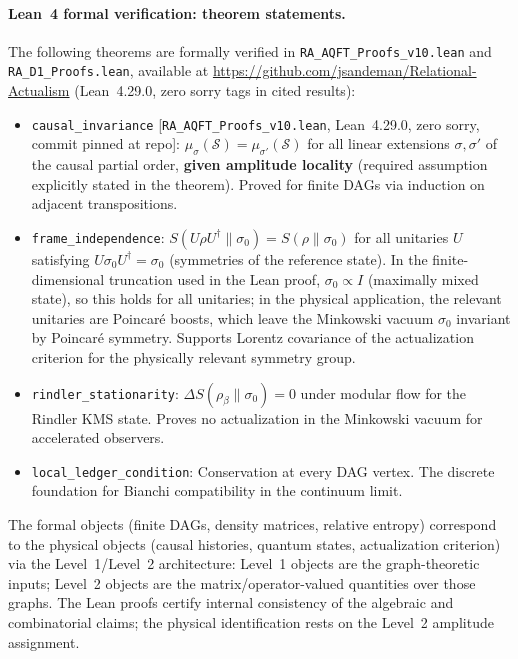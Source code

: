 \documentclass[11pt,a4paper]{article}
\theoremstyle{plain}
\theoremstyle{definition}
\theoremstyle{remark}
\begin{document}

\paragraph{Lean~4 formal verification: theorem statements.}
The following theorems are formally verified in
\texttt{RA\_AQFT\_Proofs\_v10.lean} and \texttt{RA\_D1\_Proofs.lean},
available at \url{https://github.com/jsandeman/Relational-Actualism}
(Lean~4.29.0, zero sorry tags in cited results):

\begin{itemize}[noitemsep]
  \item \texttt{causal\_invariance} [\texttt{RA\_AQFT\_Proofs\_v10.lean},
    Lean~4.29.0, zero sorry, commit pinned at repo]:
    $\mu_\sigma(\mathcal{S}) = \mu_{\sigma'}(\mathcal{S})$
    for all linear extensions $\sigma, \sigma'$ of the causal partial order,
    \textbf{given amplitude locality} (required assumption explicitly stated
    in the theorem). Proved for finite DAGs via induction on adjacent transpositions.
  \item \texttt{frame\_independence}: $S(U\rho U^\dagger \| \sigma_0) =
    S(\rho\|\sigma_0)$ for all unitaries $U$ satisfying
    $U\sigma_0 U^\dagger = \sigma_0$ (symmetries of the reference state).
    In the finite-dimensional truncation used in the Lean proof,
    $\sigma_0 \propto I$ (maximally mixed state), so this holds for
    all unitaries; in the physical application, the relevant unitaries
    are Poincar\'{e} boosts, which leave the Minkowski vacuum $\sigma_0$
    invariant by Poincar\'{e} symmetry. Supports Lorentz covariance
    of the actualization criterion for the physically relevant symmetry group.
  \item \texttt{rindler\_stationarity}: $\Delta S(\rho_\beta\|\sigma_0) = 0$
    under modular flow for the Rindler KMS state. Proves no actualization
    in the Minkowski vacuum for accelerated observers.
  \item \texttt{local\_ledger\_condition}: Conservation at every DAG vertex.
    The discrete foundation for Bianchi compatibility in the continuum limit.
\end{itemize}

The formal objects (finite DAGs, density matrices, relative entropy) correspond
to the physical objects (causal histories, quantum states, actualization criterion)
via the Level~1/Level~2 architecture: Level~1 objects are the graph-theoretic
inputs; Level~2 objects are the matrix/operator-valued quantities over those graphs.
The Lean proofs certify internal consistency of the algebraic and combinatorial
claims; the physical identification rests on the Level~2 amplitude assignment.
\end{document}
